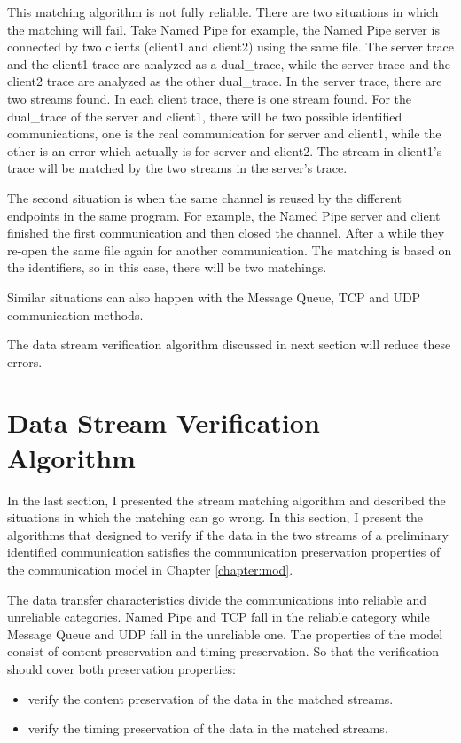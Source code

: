 This matching algorithm is not fully reliable. There are two situations in which the matching will fail. Take Named Pipe for example, the Named Pipe server is connected by two clients (client1 and client2) using the same file. The server trace and the client1 trace are analyzed as a dual\_trace, while the server trace and the client2 trace are analyzed as the other dual\_trace. In the server trace, there are two streams found. In each client trace, there is one stream found. For the dual\_trace of the server and client1, there will be two possible identified communications, one is the real communication for server and client1, while the other is an error which actually is for server and client2. The stream in client1's trace will be matched by the two streams in the server's trace. 

The second situation is when the same channel is reused by the different endpoints in the same program. For example, the Named Pipe server and client finished the first communication and then closed the channel. After a while they re-open the same file again for another communication. The matching is based on the identifiers, so in this case, there will be two matchings.

Similar situations can also happen with the Message Queue, TCP and UDP communication methods. 

The data stream verification algorithm discussed in next section will reduce these errors. 

\section{Data Stream Verification Algorithm}\label{verfication}
In the last section, I presented the stream matching algorithm and described the situations in which the matching can go wrong. In this section, I present the algorithms that designed to verify if the data in the two streams of a preliminary identified communication satisfies the communication preservation properties of the communication model in Chapter \ref{chapter:mod}. 

The data transfer characteristics divide the communications into reliable and unreliable categories. Named Pipe and TCP fall in the reliable category while Message Queue and UDP fall in the unreliable one. The properties of the model consist of content preservation and timing preservation. So that the verification should cover both preservation properties: 
\begin{itemize}
\item verify the content preservation of the data in the matched streams. 
\item verify the timing preservation of the data in the matched streams. 
\end{itemize}

